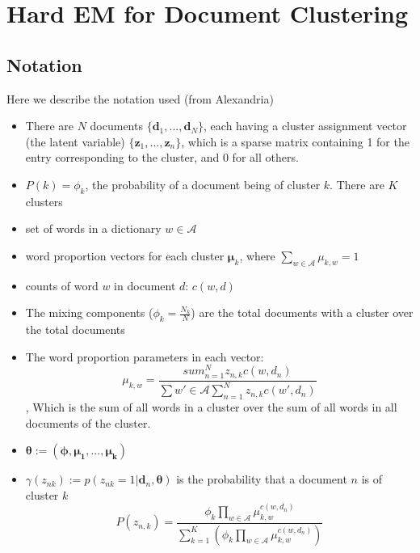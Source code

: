 \documentclass[a4paper]{article}
\begin{document}
	\section{Hard EM for Document Clustering}
	
	\subsection{Notation}
	
	Here we describe the notation used (from Alexandria)
	
	\begin{itemize}	
		\item There are $N$ documents $\{\mathbf{d}_1, ..., \mathbf{d}_N\}$, each having a cluster assignment vector (the latent variable) $\{\mathbf{z}_1, ..., \mathbf{z}_n\}$, which is a sparse matrix containing 1 for the entry corresponding to the cluster, and 0 for all others.
		\item $P(k) = \phi_k$, the probability of a document being of cluster $k$. There are $K$ clusters
		
		\item set of words in a dictionary $w \in \mathcal{A}$
		\item word proportion vectors for each cluster $\mathbf{\mu}_k$, where $\sum_{w \in \mathcal{A}} \mathcal{\mu}_{k,w} = 1$
		\item counts of word $w$ in document $d$: $c(w, d)$
		
		
		\item The mixing components ($\phi_k = \frac{N_k}{N}$) are the total documents with a cluster over the total documents
		
		\item The word proportion parameters in each vector: $$\mu_{k,w} = \frac {sum^N_{n=1}z_{n,k}c(w, d_n)} {\sum{w' \in \mathcal{A}} \sum^N_{n=1} z_{n,k}c(w', d_n)}$$,
		Which is the sum of all words in a cluster over the sum of all words in all documents of the cluster.
		
		\item $\mathbf{\theta} := (\mathbf{\phi}, \mathbf{\mu_1}, ..., \mathbf{\mu_k})$
		
		\item $\gamma(z_{nk}) := p(z_{nk} = 1 | \mathbf{d}_n, \mathbf{\theta})$ is the probability that a document $n$ is of cluster $k$ \\
		
		$$
		P(z_{n,k}) = \frac
		{\phi_k \prod_{w \in \mathcal{A}} \mu^{c(w, d_n)}_{k,w}}
		{\sum^K_{k=1}(\phi_k \prod_{w \in \mathcal{A}} \mu^{c(w, d_n)}_{k,w})} 
		$$
		
	\end{itemize}
	
\end{document}
